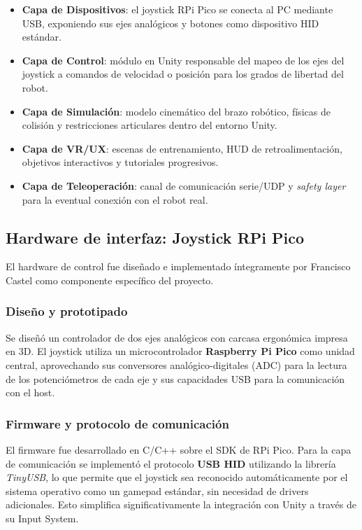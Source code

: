 \begin{itemize}
    \item \textbf{Capa de Dispositivos}: el joystick RPi Pico se conecta al PC mediante USB, exponiendo sus ejes analógicos y botones como dispositivo HID estándar.
    \item \textbf{Capa de Control}: módulo en Unity responsable del mapeo de los ejes del joystick a comandos de velocidad o posición para los grados de libertad del robot.
    \item \textbf{Capa de Simulación}: modelo cinemático del brazo robótico, físicas de colisión y restricciones articulares dentro del entorno Unity.
    \item \textbf{Capa de VR/UX}: escenas de entrenamiento, HUD de retroalimentación, objetivos interactivos y tutoriales progresivos.
    \item \textbf{Capa de Teleoperación}: canal de comunicación serie/UDP y \textit{safety layer} para la eventual conexión con el robot real.
\end{itemize}

\subsection{Hardware de interfaz: Joystick RPi Pico}

El hardware de control fue diseñado e implementado íntegramente por Francisco Castel como componente específico del proyecto.

\subsubsection*{Diseño y prototipado}

Se diseñó un controlador de dos ejes analógicos con carcasa ergonómica impresa en 3D. El joystick utiliza un microcontrolador \textbf{Raspberry Pi Pico} como unidad central, aprovechando sus conversores analógico-digitales (ADC) para la lectura de los potenciómetros de cada eje y sus capacidades USB para la comunicación con el host.

\subsubsection*{Firmware y protocolo de comunicación}

El firmware fue desarrollado en C/C++ sobre el SDK de RPi Pico. Para la capa de comunicación se implementó el protocolo \textbf{USB HID} utilizando la librería \textit{TinyUSB}, lo que permite que el joystick sea reconocido automáticamente por el sistema operativo como un gamepad estándar, sin necesidad de drivers adicionales. Esto simplifica significativamente la integración con Unity a través de su Input System.

